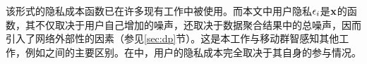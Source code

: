 	该形式的隐私成本函数已在许多现有工作中被使用\cite{dandekar2014privacy,ghosh2015selling,jin2016inception,zhang2016privacy}。而本文中用户隐私$\epsilon_i$是$\bf{x}$的函数，其不仅取决于用户自己增加的噪声，还取决于数据聚合结果中的总噪声，因而引入了{\kaishu 网络外部性}的因素（参见\ref{sec:dp}节）。这是本工作与移动群智感知其他工作，例如\cite{jin2016inception}之间的主要区别。在\cite{jin2016inception}中，用户的隐私成本完全取决于其自身的参与情况。
	
